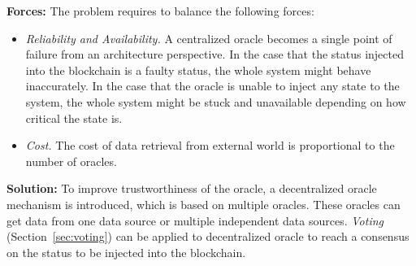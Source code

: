\vspace{0.5em}\noindent \textbf{Forces:} 
The problem requires to balance the following forces:
\begin{itemize}
 \item \textit{Reliability and Availability.} A centralized oracle becomes a single point of failure from an architecture perspective. In the case that the status injected into the blockchain is a faulty status, the whole system might behave inaccurately. In the case that the oracle is unable to inject any state to the system, the whole system might be stuck and unavailable depending on how critical the state is. 
 \item \textit{Cost.} The cost of data retrieval from external world is proportional to the number of oracles.  
\end{itemize}

\vspace{0.5em}\noindent \textbf{Solution:} 
To improve trustworthiness of the oracle, a decentralized oracle mechanism is introduced, which is based on multiple oracles. These oracles can get data from one data source or multiple independent data sources. %
\textit{Voting} (Section~\ref{sec:voting}) can be applied to decentralized oracle to reach a consensus on the status to be injected into the blockchain. %



